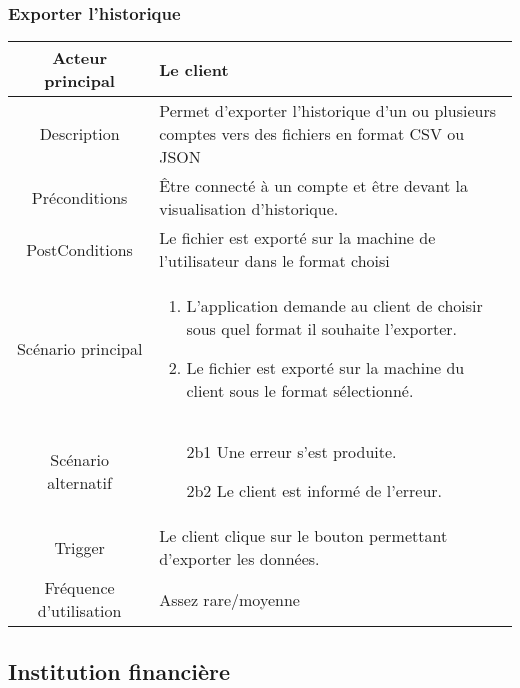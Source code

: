 \documentclass{article}
\begin{document}
\subsubsection{Exporter l'historique}
\begin{table}[h]
      \begin{tabular}{|c|p{10cm}|}
         \hline
         Acteur principal&Le client\\
         \hline
         Description&Permet d'exporter l'historique d'un ou plusieurs comptes vers des fichiers en format CSV ou JSON\\
         \hline
         Préconditions&Être connecté à un compte et être devant la visualisation d'historique.\\
         \hline
         PostConditions&Le fichier est exporté sur la machine de l'utilisateur dans le format choisi\\
         \hline
         Scénario principal& 
               \begin{enumerate}
                  \item L'application demande au client de choisir sous quel format il souhaite l'exporter.
                  \item Le fichier est exporté sur la machine du client sous le format sélectionné.
               \end{enumerate}     \\
         \hline
         Scénario alternatif&
         \begin{itemize}
            \item[2b1] Une erreur s'est produite.
            \item[2b2] Le client est informé de l'erreur.  
         \end{itemize}\\
         \hline
         Trigger&Le client clique sur le bouton permettant d'exporter les données.\\
         \hline
         Fréquence d'utilisation&Assez rare/moyenne\\
         \hline
      \end{tabular}
\end{table}

\newpage
\subsection{Institution financière}
\end{document}

